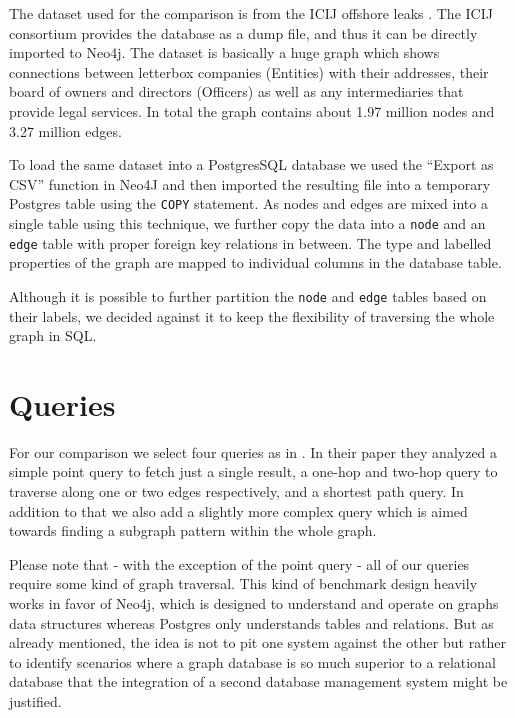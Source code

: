 \documentclass[11pt, a4paper,oneside,chapterprefix=false]{scrbook}
\begin{document}
The dataset used for the comparison is from the ICIJ offshore leaks \cite{offshoreleaks}.
The ICIJ consortium provides the database as a dump file, and thus it can be directly imported to Neo4j.
The dataset is basically a huge graph which shows connections between letterbox companies (Entities) with their addresses, their board of owners and directors (Officers) as well as any intermediaries that provide legal services. In total the graph contains about  1.97 million nodes and 3.27 million edges.

To load the same dataset into a PostgresSQL database we used the ``Export as CSV'' function in Neo4J and then imported the resulting file into a temporary Postgres table using the \lstinline{COPY} statement.
As nodes and edges are mixed into a single table using this technique, we further copy the data into a \lstinline{node} and an \lstinline{edge} table with proper foreign key relations in between.
The type and labelled properties of the graph are mapped to individual columns in the database table.

Although it is possible to further partition the \lstinline{node} and \lstinline{edge} tables based on their labels, we decided against it to keep the flexibility of traversing the whole graph in SQL.

\section{Queries} \label{sec:benchmark}

For our comparison we select four queries as in \cite{graphdbbenchmark}.
In their paper they analyzed a simple point query to fetch just a single result, a one-hop and two-hop query to traverse along one or two edges respectively, and a shortest path query.
In addition to that we also add a slightly more complex query which is aimed towards finding a subgraph pattern within the whole graph.

Please note that - with the exception of the point query - all of our queries require some kind of graph traversal.
This kind of benchmark design heavily works in favor of Neo4j, which is designed to understand and operate on graphs data structures whereas Postgres only understands tables and relations.
But as already mentioned, the idea is not to pit one system against the other but rather to identify scenarios where a graph database is so much superior to a relational database that the integration of a second database management system might be justified.
\end{document}

